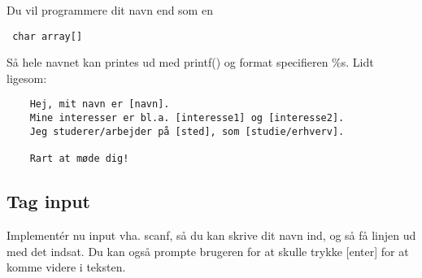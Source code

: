\documentclass[hidelinks]{article} %
\begin{document}
Du vil programmere dit navn end som en
\begin{verbatim} char array[]
\end{verbatim}
Så hele navnet kan printes ud med printf() og format specifieren \%s.
Lidt ligesom:
\begin{verbatim}
	Hej, mit navn er [navn].
	Mine interesser er bl.a. [interesse1] og [interesse2].
	Jeg studerer/arbejder på [sted], som [studie/erhverv].
	
	Rart at møde dig!
\end{verbatim}
	\subsection{Tag input}
	Implementér nu input vha. scanf, så du kan skrive dit navn ind, og så få linjen ud med det indsat. Du kan også prompte brugeren for at skulle trykke [enter] for at komme videre i teksten.
\end{document}
